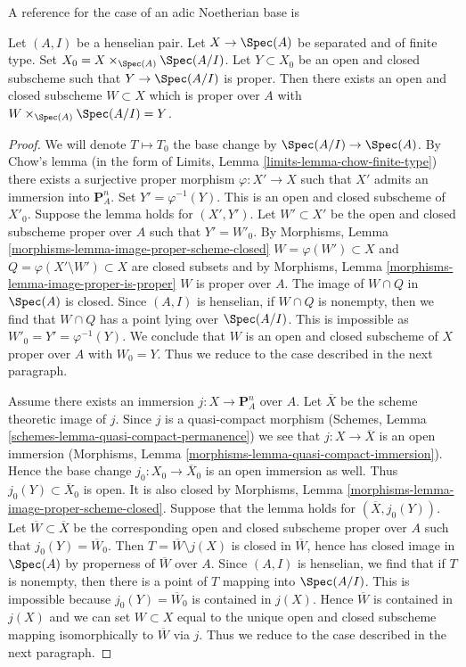 \begin{lemma}
\label{lemma-split-off-proper-part-henselian}
\begin{reference}
A reference for the case of an adic Noetherian base is
\cite[III, Proposition 5.5.1]{EGA}
\end{reference}
Let $(A, I)$ be a henselian pair. Let $X \to \Spec(A)$
be separated and of finite type. Set $X_0 = X \times_{\Spec(A)} \Spec(A/I)$.
Let $Y \subset X_0$ be an open and closed subscheme such that
$Y \to \Spec(A/I)$ is proper. Then there exists an open and closed
subscheme $W \subset X$ which is proper over $A$ with
$W \times_{\Spec(A)} \Spec(A/I) = Y$.
\end{lemma}

\begin{proof}
We will denote $T \mapsto T_0$ the base change by $\Spec(A/I) \to \Spec(A)$.
By Chow's lemma (in the form of
Limits, Lemma \ref{limits-lemma-chow-finite-type})
there exists a surjective proper morphism $\varphi : X' \to X$ such
that $X'$ admits an immersion into $\mathbf{P}^n_A$.
Set $Y' = \varphi^{-1}(Y)$. This is an open and closed subscheme
of $X'_0$. Suppose the lemma holds for $(X', Y')$. Let $W' \subset X'$
be the open and closed subscheme proper over $A$ such that $Y' = W'_0$.
By Morphisms, Lemma \ref{morphisms-lemma-image-proper-scheme-closed}
$W = \varphi(W') \subset X$ and
$Q = \varphi(X' \setminus W') \subset X$ are closed subsets and by
Morphisms, Lemma \ref{morphisms-lemma-image-proper-is-proper}
$W$ is proper over $A$. The image of $W \cap Q$ in $\Spec(A)$ is closed.
Since $(A, I)$ is henselian, if $W \cap Q$ is nonempty, then we
find that $W \cap Q$ has a point lying over $\Spec(A/I)$.
This is impossible as $W'_0 = Y' = \varphi^{-1}(Y)$.
We conclude that $W$ is an open and closed subscheme
of $X$ proper over $A$ with $W_0 = Y$.
Thus we reduce to the case described in the next paragraph.

\medskip\noindent
Assume there exists an immersion $j : X \to \mathbf{P}^n_A$ over $A$.
Let $\overline{X}$ be the scheme theoretic image of $j$.
Since $j$ is a quasi-compact morphism
(Schemes, Lemma \ref{schemes-lemma-quasi-compact-permanence})
we see that $j : X \to \overline{X}$ is an open immersion
(Morphisms, Lemma \ref{morphisms-lemma-quasi-compact-immersion}).
Hence the base change $j_0 : X_0 \to \overline{X}_0$
is an open immersion as well.
Thus $j_0(Y) \subset \overline{X}_0$ is open.
It is also closed by Morphisms, Lemma
\ref{morphisms-lemma-image-proper-scheme-closed}.
Suppose that the lemma holds for $(\overline{X}, j_0(Y))$.
Let $\overline{W} \subset \overline{X}$ be the
corresponding open and closed subscheme proper over $A$
such that $j_0(Y) = \overline{W}_0$.
Then $T = \overline{W} \setminus j(X)$ is closed in $\overline{W}$,
hence has closed image in $\Spec(A)$ by properness of $\overline{W}$
over $A$. Since $(A, I)$ is henselian, we find that if $T$
is nonempty, then there is a point of $T$ mapping into $\Spec(A/I)$.
This is impossible because $j_0(Y) = \overline{W}_0$ is contained in $j(X)$.
Hence $\overline{W}$ is contained in $j(X)$ and we can
set $W \subset X$ equal to the unique open and closed
subscheme mapping isomorphically to $\overline{W}$ via $j$.
Thus we reduce to the case described in the next paragraph.


\end{proof}
